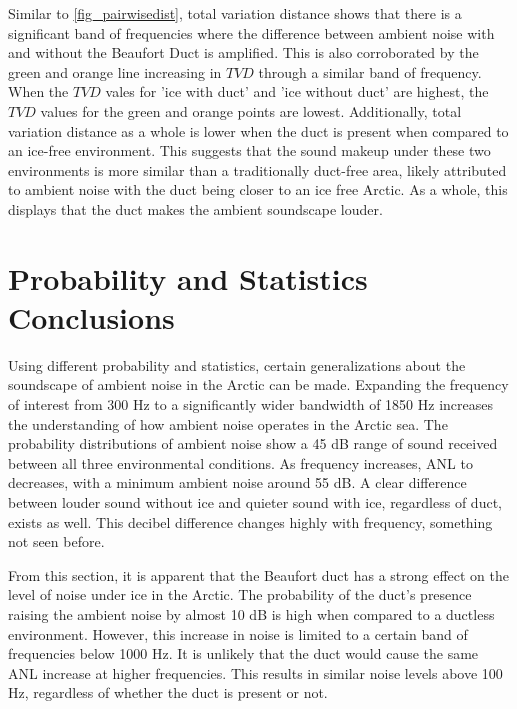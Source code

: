 Similar to \autoref{fig_pairwisedist}, total variation distance shows that there is a significant band of frequencies where the difference between ambient noise with and without the Beaufort Duct is amplified. This is also corroborated by the green and orange line increasing in $TVD$ through a similar band of frequency. When the $TVD$ vales for 'ice with duct' and 'ice without duct' are highest, the $TVD$ values for the green and orange points are lowest. Additionally, total variation distance as a whole is lower when the duct is present when compared to an ice-free environment. This suggests that the sound makeup under these two environments is more similar than a traditionally duct-free area, likely attributed to ambient noise with the duct being closer to an ice free Arctic. As a whole, this displays that the duct makes the ambient soundscape louder.




\section{Probability and Statistics Conclusions}
Using different probability and statistics, certain generalizations about the soundscape of ambient noise in the Arctic can be made. Expanding the frequency of interest from 300 Hz to a significantly wider bandwidth of 1850 Hz increases the understanding of how ambient noise operates in the Arctic sea. The probability distributions of ambient noise show a 45 dB range of sound received between all three environmental conditions. As frequency increases, ANL to decreases, with a minimum ambient noise around 55 dB. A clear difference between louder sound without ice and quieter sound with ice, regardless of duct, exists as well. This decibel difference changes highly with frequency, something not seen before.

From this section, it is apparent that the Beaufort duct has a strong effect on the level of noise under ice in the Arctic. The probability of the duct's presence raising the ambient noise by almost 10 dB is high when compared to a ductless environment. However, this increase in noise is limited to a certain band of frequencies below 1000 Hz. It is unlikely that the duct would cause the same ANL increase at higher frequencies. This results in similar noise levels above 100 Hz, regardless of whether the duct is present or not.


